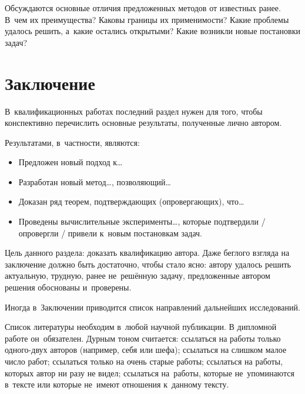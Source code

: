 \documentclass[12pt,fleqn]{article}
\begin{document}
Обсуждаются основные отличия предложенных методов от известных ранее. 
В~чем их преимущества? 
Каковы границы их применимости? 
Какие проблемы удалось решить, а~какие остались открытыми? 
Какие возникли новые постановки задач?

\section{Заключение}

В~квалификационных работах последний раздел нужен для того, чтобы 
конспективно перечислить основные результаты, полученные лично автором. 

Результатами, в~частности, являются:
\begin{itemize}
\item 
    Предложен новый подход к\dots
\item 
    Разработан новый метод\dots, позволяющий\dots
\item 
    Доказан ряд теорем, подтверждающих (опровергающих), что\dots
\item 
    Проведены вычислительные эксперименты\dots,
    которые подтвердили / опровергли / привели к~новым постановкам задач.
\end{itemize}
    
Цель данного раздела: доказать квалификацию автора. 
Даже беглого взгляда на заключение должно быть достаточно, чтобы стало ясно: 
автору удалось решить актуальную, трудную, ранее не~решённую задачу, 
предложенные автором решения обоснованы и~проверены.

Иногда в~Заключении приводится список направлений дальнейших исследований.

\newpage
Список литературы необходим в~любой научной публикации. 
В дипломной работе он~обязателен. 
Дурным тоном считается:
ссылаться на работы только одного-двух авторов (например, себя или шефа);
ссылаться на слишком малое число работ;
ссылаться только на очень старые работы;
ссылаться на работы, которых автор ни разу не видел;
ссылаться на~работы, которые не~упоминаются в~тексте
или которые не~имеют отношения к~данному тексту.

\renewcommand{\bibname}{Список литературы}
\addcontentsline{toc}{section}{\bibname}

\nocite{hastie09elements,bishop06pattern,zhuravlev06recognition,zhuravlev78prob33,shlezinger04ten,boucheron05theory}

\def\BibUrl#1.{}\def\BibAnnote#1.{}


\end{document}
